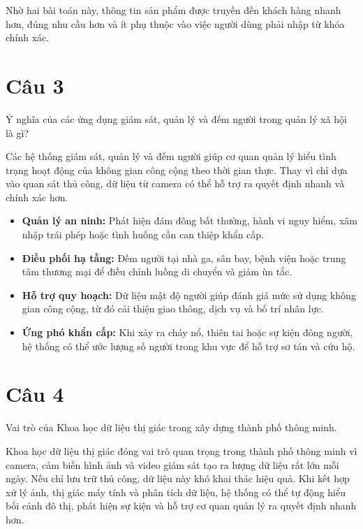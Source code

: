 Nhờ hai bài toán này, thông tin sản phẩm được truyền đến khách hàng nhanh hơn, đúng nhu cầu hơn và ít phụ thuộc vào việc người dùng phải nhập từ khóa chính xác.


\section*{Câu 3}
Ý nghĩa của các ứng dụng giám sát, quản lý và đếm người trong quản lý xã hội là gì?

Các hệ thống giám sát, quản lý và đếm người giúp cơ quan quản lý hiểu tình trạng hoạt động của không gian công cộng theo thời gian thực. Thay vì chỉ dựa vào quan sát thủ công, dữ liệu từ camera có thể hỗ trợ ra quyết định nhanh và chính xác hơn.

\begin{itemize}
    \item \textbf{Quản lý an ninh:} Phát hiện đám đông bất thường, hành vi nguy hiểm, xâm nhập trái phép hoặc tình huống cần can thiệp khẩn cấp.

    \item \textbf{Điều phối hạ tầng:} Đếm người tại nhà ga, sân bay, bệnh viện hoặc trung tâm thương mại để điều chỉnh luồng di chuyển và giảm ùn tắc.

    \item \textbf{Hỗ trợ quy hoạch:} Dữ liệu mật độ người giúp đánh giá mức sử dụng không gian công cộng, từ đó cải thiện giao thông, dịch vụ và bố trí nhân lực.

    \item \textbf{Ứng phó khẩn cấp:} Khi xảy ra cháy nổ, thiên tai hoặc sự kiện đông người, hệ thống có thể ước lượng số người trong khu vực để hỗ trợ sơ tán và cứu hộ.
\end{itemize}


\section*{Câu 4}
Vai trò của Khoa học dữ liệu thị giác trong xây dựng thành phố thông minh.

Khoa học dữ liệu thị giác đóng vai trò quan trọng trong thành phố thông minh vì camera, cảm biến hình ảnh và video giám sát tạo ra lượng dữ liệu rất lớn mỗi ngày. Nếu chỉ lưu trữ thủ công, dữ liệu này khó khai thác hiệu quả. Khi kết hợp xử lý ảnh, thị giác máy tính và phân tích dữ liệu, hệ thống có thể tự động hiểu bối cảnh đô thị, phát hiện sự kiện và hỗ trợ cơ quan quản lý ra quyết định nhanh hơn.

